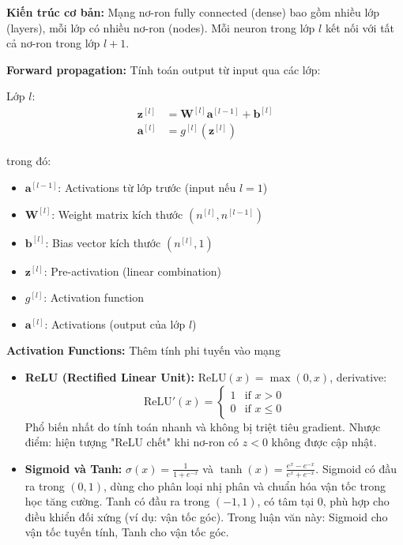 \textbf{Kiến trúc cơ bản:} Mạng nơ-ron fully connected (dense) bao gồm nhiều lớp (layers), mỗi lớp có nhiều nơ-ron (nodes). Mỗi neuron trong lớp $l$ kết nối với tất cả nơ-ron trong lớp $l+1$.

\textbf{Forward propagation:} Tính toán output từ input qua các lớp:

Lớp $l$:
\begin{equation}
\begin{aligned}
\mathbf{z}^{[l]} &= \mathbf{W}^{[l]} \mathbf{a}^{[l-1]} + \mathbf{b}^{[l]} \\
\mathbf{a}^{[l]} &= g^{[l]}(\mathbf{z}^{[l]})
\end{aligned}
\end{equation}

trong đó:
\begin{itemize}
\item $\mathbf{a}^{[l-1]}$: Activations từ lớp trước (input nếu $l=1$)
\item $\mathbf{W}^{[l]}$: Weight matrix kích thước $(n^{[l]}, n^{[l-1]})$
\item $\mathbf{b}^{[l]}$: Bias vector kích thước $(n^{[l]}, 1)$
\item $\mathbf{z}^{[l]}$: Pre-activation (linear combination)
\item $g^{[l]}$: Activation function
\item $\mathbf{a}^{[l]}$: Activations (output của lớp $l$)
\end{itemize}

\textbf{Activation Functions:} Thêm tính phi tuyến vào mạng

\begin{itemize}
\item \textbf{ReLU (Rectified Linear Unit):} $\text{ReLU}(x) = \max(0, x)$, derivative:
\[
\text{ReLU}'(x) = \begin{cases}
1 & \text{if } x > 0 \\
0 & \text{if } x \leq 0
\end{cases}
\]
Phổ biến nhất do tính toán nhanh và không bị triệt tiêu gradient. Nhược điểm: hiện tượng "ReLU chết" khi nơ-ron có $z < 0$ không được cập nhật.

\item \textbf{Sigmoid và Tanh:} $\sigma(x) = \frac{1}{1 + e^{-x}}$ và $\tanh(x) = \frac{e^x - e^{-x}}{e^x + e^{-x}}$. Sigmoid có đầu ra trong $(0, 1)$, dùng cho phân loại nhị phân và chuẩn hóa vận tốc trong học tăng cường. Tanh có đầu ra trong $(-1, 1)$, có tâm tại 0, phù hợp cho điều khiển đối xứng (ví dụ: vận tốc góc). Trong luận văn này: Sigmoid cho vận tốc tuyến tính, Tanh cho vận tốc góc.
\end{itemize}

